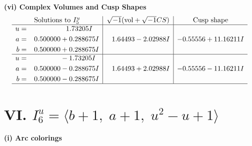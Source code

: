 \documentclass[1p]{elsarticle_modified}
\theoremstyle{definition}
\newcommand{\I}{\sqrt{-1}}
\begin{document}
\newpage\flushleft \textbf{(vi) Complex Volumes and Cusp Shapes}
$$\begin{array}{c|c|c}  
\text{Solutions to }I^u_{5}& \I (\text{vol} + \sqrt{-1}CS) & \text{Cusp shape}\\
 \hline 
\begin{aligned}
u &= \phantom{-0.000000 -}1.73205 I \\
a &= \phantom{-}0.500000 + 0.288675 I \\
b &= \phantom{-}0.500000 + 0.288675 I\end{aligned}
 & \phantom{-}1.64493 - 2.02988 I & -0.55556 + 11.16211 I \\ \hline\begin{aligned}
u &= \phantom{-0.000000 } -1.73205 I \\
a &= \phantom{-}0.500000 - 0.288675 I \\
b &= \phantom{-}0.500000 - 0.288675 I\end{aligned}
 & \phantom{-}1.64493 + 2.02988 I & -0.55556 - 11.16211 I\\
 \hline 
 \end{array}$$\newpage\newpage\renewcommand{\arraystretch}{1}
\centering \section*{VI. $I^u_{6}= \langle b+1,\;a+1,\;u^2- u+1 \rangle$}
\flushleft \textbf{(i) Arc colorings}\\
\end{document}
